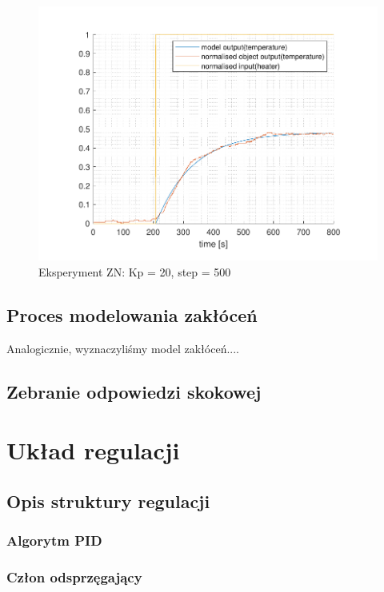 \documentclass{mwrep}
\begin{document}
\begin{figure}[H]
\centering
\includegraphics[scale=1.0]{materialy/krystian_plots/wykresik_model_obiekt.pdf}
\caption{Eksperyment ZN: Kp = 20, step = 500}
\end{figure}

\section{Proces modelowania zakłóceń}
\label{ModelowanieZaklocen}
Analogicznie, wyznaczyliśmy model zakłóceń....

\section{Zebranie odpowiedzi skokowej}
\label{OdpowiedzSkokowa}

\chapter{Układ regulacji}
\label{UkladRegulacji}

\section{Opis struktury regulacji}
\label{OpisStruktury}

\subsection{Algorytm PID}
\label{PID}

\subsection{Człon odsprzęgający}
\label{Odsprzeganie}
\end{document}
